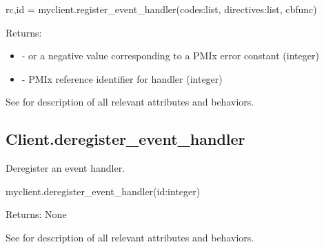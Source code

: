 \pyspecificstart
\begin{codepar}
rc,id = myclient.register_event_handler(codes:list,
                        directives:list, cbfunc)
\end{codepar}
\pyspecificend

\begin{arglist}
\end{arglist}

Returns:

\begin{itemize}
    \item {} -  or a negative value corresponding to a PMIx error constant (integer)
    \item {} - \ac{PMIx} reference identifier for handler (integer)
\end{itemize}

See  for description of all relevant attributes and behaviors.


\subsection{Client.deregister_event_handler}

\summary

Deregister an event handler.

\format

\pyspecificstart
\begin{codepar}
myclient.deregister_event_handler(id:integer)
\end{codepar}
\pyspecificend

\begin{arglist}
\end{arglist}

Returns: None

See  for description of all relevant attributes and behaviors.


